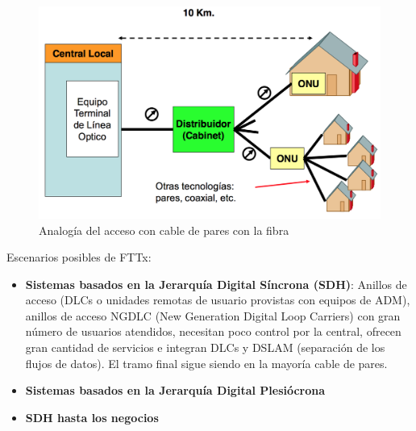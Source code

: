 \documentclass[10pt,portrait, twocolumn]{article}
\begin{document}

	\begin{figure}[!ht]
 		\centering
  		 \includegraphics[scale = 0.25]{images/Analogia}
		\caption{Analogía del acceso con cable de pares con la fibra}
	\end{figure}	

Escenarios posibles de FTTx:

	\begin{itemize}
		\item \textbf{Sistemas basados en la Jerarquía Digital Síncrona (SDH)}: Anillos de acceso (DLCs o unidades remotas de usuario provistas con equipos de ADM), anillos de acceso NGDLC (New Generation Digital Loop Carriers) con gran número de usuarios atendidos, necesitan poco control por la central, ofrecen gran cantidad de servicios e integran DLCs y DSLAM (separación de los flujos de datos). El tramo final sigue siendo en la mayoría cable de pares.
		\item \textbf{Sistemas basados en la Jerarquía Digital Plesiócrona}
		\item \textbf{SDH hasta los negocios}
	\end{itemize}


\end{document}
